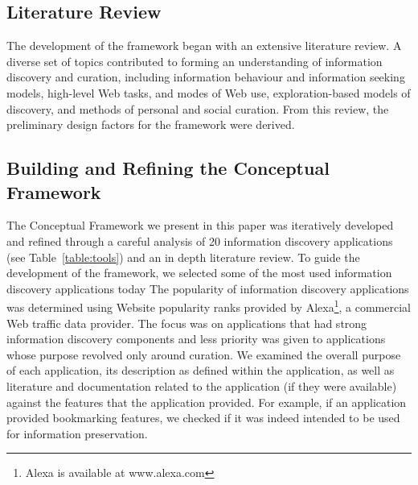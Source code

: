 \documentclass{sigchi}
\begin{document}
{\subsection{Literature Review}
\label{subsection:lit_review}
The development of the framework began with an extensive literature review. A diverse set of topics contributed to forming an understanding of information discovery and curation, including information behaviour and information seeking models, high-level Web tasks, and modes of Web use, exploration-based models of discovery, and methods of personal and social curation. From this review, the preliminary design factors for the framework were derived.
}%

{\subsection{Building and Refining the Conceptual Framework}
\label{subsection:building}
The Conceptual Framework we present in this paper was iteratively developed and refined through a careful analysis of 20 information discovery applications (see Table~\ref{table:tools}) and an in depth literature review. 
%
To guide the development of the framework, we selected some of the most used information discovery applications today
The popularity of information discovery applications was determined using Website popularity ranks provided by Alexa\footnote[1]{Alexa is available at www.alexa.com}, a commercial Web traffic data provider. The focus was on applications that had strong information discovery components and less priority was given to applications whose purpose revolved only around curation.
%
We examined the overall purpose of each application, its description as defined within the application, as well as literature and documentation related to the application (if they were available) against the features that the application provided. For example, if an application provided bookmarking features, we checked if it was indeed intended to be used for information preservation. 

}
\end{document}
